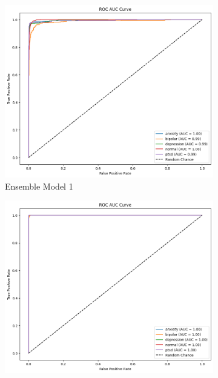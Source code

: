 \pagebreak

\begin{figure}[h!]
    \centering
    \begin{subfigure}[b]{0.49\textwidth}
        \centering
        \includegraphics[width=\textwidth]{Images/EM ROC.png}
        \caption*{Ensemble Model 1}
        \label{dfdl12443}  %
    \end{subfigure}
    \hfill
    \begin{subfigure}[b]{0.47\textwidth}
        \centering
        \includegraphics[width=\textwidth]{Images/EM2 ROC.png}

\end{subfigure}
\end{figure}

